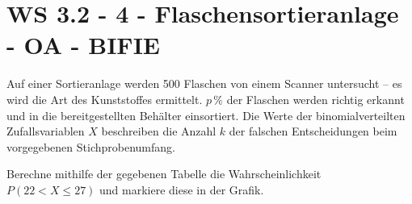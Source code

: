 \section{WS 3.2 - 4 - Flaschensortieranlage - OA - BIFIE}

\begin{beispiel}[WS 3.2]{1} %
Auf einer Sortieranlage werden 500 Flaschen von einem Scanner untersucht -- es wird die Art
des Kunststoffes ermittelt. $p\,\%$ der Flaschen werden richtig erkannt und in die bereitgestellten Behälter einsortiert. Die Werte der binomialverteilten Zufallsvariablen $X$ beschreiben die Anzahl $k$ der falschen Entscheidungen beim vorgegebenen Stichprobenumfang.

 Berechne  mithilfe der gegebenen Tabelle die Wahrscheinlichkeit $P(22 < X \leq 27)$ und markiere diese in der Grafik. 
\leer


\end{beispiel}
